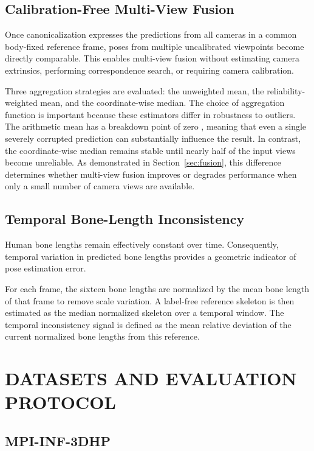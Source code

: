 \documentclass[12pt,a4paper]{report}
\begin{document}
\section{Calibration-Free Multi-View Fusion}

Once canonicalization expresses the predictions from all cameras in a common body-fixed reference frame, poses from multiple uncalibrated viewpoints become directly comparable. This enables multi-view fusion without estimating camera extrinsics, performing correspondence search, or requiring camera calibration.

Three aggregation strategies are evaluated: the unweighted mean, the reliability-weighted mean, and the coordinate-wise median. The choice of aggregation function is important because these estimators differ in robustness to outliers. The arithmetic mean has a breakdown point of zero \cite{hampel}, meaning that even a single severely corrupted prediction can substantially influence the result. In contrast, the coordinate-wise median remains stable until nearly half of the input views become unreliable. As demonstrated in Section~\ref{sec:fusion}, this difference determines whether multi-view fusion improves or degrades performance when only a small number of camera views are available.

\section{Temporal Bone-Length Inconsistency}

Human bone lengths remain effectively constant over time. Consequently, temporal variation in predicted bone lengths provides a geometric indicator of pose estimation error.

For each frame, the sixteen bone lengths are normalized by the mean bone length of that frame to remove scale variation. A label-free reference skeleton is then estimated as the median normalized skeleton over a temporal window. The temporal inconsistency signal is defined as the mean relative deviation of the current normalized bone lengths from this reference.

\chapter{DATASETS AND EVALUATION PROTOCOL}
\label{ch:data}

\section{MPI-INF-3DHP}
\end{document}
